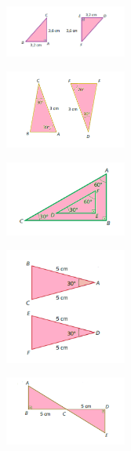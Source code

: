 \begin{escolha}
\item
\begin{figure}[H]
\centering\includegraphics[width=4cm]{./imgSAEB_8_MAT/media/image19.png}
\end{figure}  
\item
\begin{figure}[H]
\centering\includegraphics[width=4cm]{./imgSAEB_8_MAT/media/image20.png}
\end{figure}  
\item
\begin{figure}[H]
\centering\includegraphics[width=4cm]{./imgSAEB_8_MAT/media/image21.png}
\end{figure}  
\item
\begin{figure}[H]
\centering\includegraphics[width=4cm]{./imgSAEB_8_MAT/media/image22.png}
\end{figure}  
\item
\begin{figure}[H]
\centering\includegraphics[width=4cm]{./imgSAEB_8_MAT/media/image23.png}
\end{figure}  
\end{escolha}


